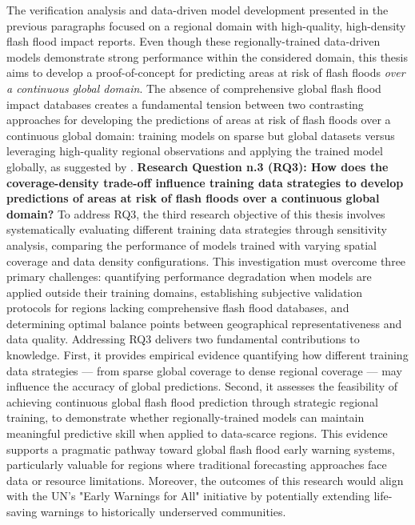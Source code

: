 The verification analysis and data-driven model development presented in the previous paragraphs focused on a regional domain with high-quality, high-density flash flood impact reports. Even though these regionally-trained data-driven models demonstrate strong performance within the considered domain, this thesis aims to develop a proof-of-concept for predicting areas at risk of flash floods \textit{over a continuous global domain}. The absence of comprehensive global flash flood impact databases \citep{Panwar_2020} creates a fundamental tension between two contrasting approaches for developing the predictions of areas at risk of flash floods over a continuous global domain: training models on sparse but global datasets versus leveraging high-quality regional observations and applying the trained model globally, as suggested by \citet{Kratzert_2024}. \textcolor{colour_chapter7}{\textbf{Research Question n.3 (RQ3): How does the coverage-density trade-off influence training data strategies to develop predictions of areas at risk of flash floods over a continuous global domain?}} To address RQ3, the third research objective of this thesis involves systematically evaluating different training data strategies through sensitivity analysis, comparing the performance of models trained with varying spatial coverage and data density configurations. This investigation must overcome three primary challenges: quantifying performance degradation when models are applied outside their training domains, establishing subjective validation protocols for regions lacking comprehensive flash flood databases, and determining optimal balance points between geographical representativeness and data quality. Addressing RQ3 delivers two fundamental contributions to knowledge. First, it provides empirical evidence quantifying how different training data strategies — from sparse global coverage to dense regional coverage — may influence the accuracy of global predictions. Second, it assesses the feasibility of achieving continuous global flash flood prediction through strategic regional training, to demonstrate whether regionally-trained models can maintain meaningful predictive skill when applied to data-scarce regions. This evidence supports a pragmatic pathway toward global flash flood early warning systems, particularly valuable for regions where traditional forecasting approaches face data or resource limitations. Moreover, the outcomes of this research would align with the UN's "Early Warnings for All" initiative by potentially extending life-saving warnings to historically underserved communities.

